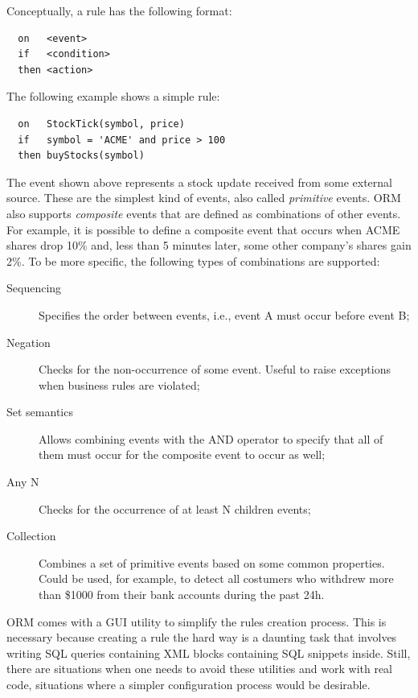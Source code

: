 Conceptually, a rule has the following format:

\lstset{
  language=Oracle,
  columns=fullflexible,
  basicstyle=\tt,
  keywordstyle=\bf,
}


\begin{lstlisting}
  on   <event>
  if   <condition>
  then <action>
\end{lstlisting}

The following example shows a simple rule:

\begin{lstlisting}
  on   StockTick(symbol, price)
  if   symbol = 'ACME' and price > 100
  then buyStocks(symbol)
\end{lstlisting}

The event shown above represents a stock update received from some
external source. These are the simplest kind of events, also called
\emph{primitive} events. ORM also supports \emph{composite} events
that are defined as combinations of other events. For example, it is
possible to define a composite event that occurs when ACME shares drop
10\% and, less than 5 minutes later, some other company's shares gain
2\%. To be more specific, the following types of combinations are
supported:
\begin{description}
\item [Sequencing] Specifies the order between events, i.e., event A
  must occur before event B;
\item [Negation] Checks for the non-occurrence of some event. Useful
  to raise exceptions when business rules are violated;
\item [Set semantics] Allows combining events with the AND operator to
  specify that all of them must occur for the composite event to occur
  as well;
\item [Any N] Checks for the occurrence of at least N children events;
\item [Collection] Combines a set of primitive events based on some
  common properties. Could be used, for example, to detect all
  costumers who withdrew more than \$1000 from their bank accounts
  during the past 24h.
\end{description}

ORM comes with a GUI utility to simplify the rules creation
process. This is necessary because creating a rule the hard way is a
daunting task that involves writing SQL queries containing XML blocks
containing SQL snippets inside. Still, there are situations when one
needs to avoid these utilities and work with real code, situations
where a simpler configuration process would be desirable.

